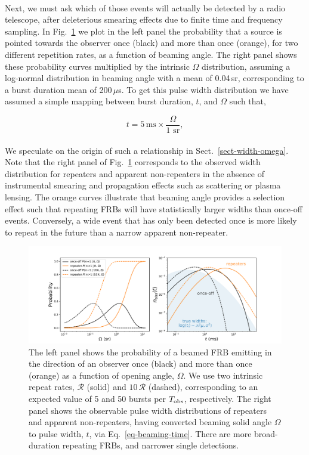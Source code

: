 \documentclass[fleqn,usenatbib]{mnras}
\begin{document}
\\
\noindent Next, we must ask which of those events will actually be detected 
by a radio telescope, after deleterious smearing effects due to finite 
time and frequency sampling. In Fig.~\ref{fig-prob-rep} we plot  
in the left panel the probability that a source is pointed towards the observer once (black) and more than 
once (orange), for two different repetition rates, as a function of 
beaming angle. The right panel shows these probability curves multiplied by the intrinsic 
$\Omega$ distribution, assuming a log-normal 
distribution in beaming angle with a
mean of 0.04\,sr, corresponding to a burst duration mean 
of 200\,$\mu$s. 
To get this pulse width distribution we have assumed a simple mapping between burst duration, $t$, 
and $\Omega$ such that,

\begin{equation}
    \label{eq-beaming-time}
    t = 5\,\mathrm{ms} \times \frac{\Omega}{1\,\,\mathrm{sr}},
\end{equation}
\\
\noindent We speculate on the origin of such a relationship in Sect.~\ref{sect-width-omega}.
Note that the right panel of Fig.~\ref{fig-prob-rep} corresponds to the observed width 
distribution for repeaters and apparent non-repeaters in the absence of instrumental 
smearing and propagation effects such as scattering or plasma lensing. The orange 
curves illustrate that beaming angle provides a selection effect such that 
repeating FRBs will have statistically larger widths than 
once-off events. Conversely, a wide event that has only been detected once 
is more likely to repeat in the future than a narrow apparent non-repeater.

\begin{figure}[ht]
	\centering
	\includegraphics[scale=0.5]{repetition_dist.pdf}
	\caption{The left panel shows the probability of a beamed 
	FRB emitting in the direction of an observer once (black) 
	and more than once (orange) as a function 
	of opening angle, $\Omega$. We use two intrinsic repeat rates, $\mathcal{R}$ (solid) and $10\,\mathcal{R}$ (dashed), corresponding to an expected value of 5 and 50 bursts per $T_{\rm obs}$, respectively. The right panel 
	shows the observable pulse width distributions of repeaters and apparent non-repeaters, having converted beaming solid angle $\Omega$ to 
	pulse width, $t$, via Eq.~\ref{eq-beaming-time}. 
	There are more broad-duration repeating FRBs, and narrower
	single detections.}
    \label{fig-prob-rep}
\end{figure}
\end{document}
